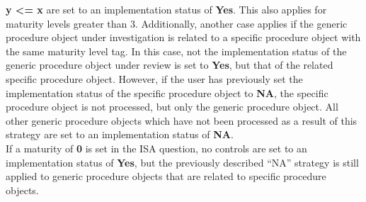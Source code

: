 \documentclass[a4paper,10pt]{book}
\begin{document}
\textbf{y <= x} are set to an implementation status of \textbf{Yes}. This also applies for maturity levels greater
than 3. Additionally, another case applies if the generic procedure object under investigation is related to a specific
procedure object with the same maturity level tag. In this case, not the implementation status of the generic procedure
object under review is set to \textbf{Yes}, but that of the related specific procedure object. However, if the user has
previously set the implementation status of the specific procedure object to \textbf{NA}, the specific procedure object
is not processed, but only the generic procedure object. All other generic procedure objects which have not been processed
as a result of this strategy are set to an implementation status of \textbf{NA}.
\newline\\
If a maturity of \textbf{0} is set in the ISA question, no controls are set to an implementation status of \textbf{Yes},
but the previously described ``NA'' strategy is still applied to generic procedure objects that are related to specific procedure objects.
\end{document}

